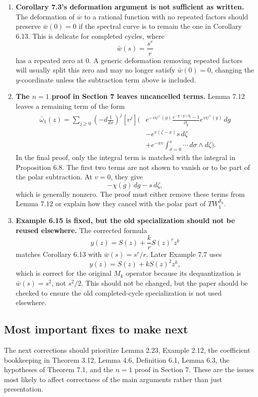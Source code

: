 \documentclass[11pt]{article}
\begin{document}
\begin{enumerate}[label=\textbf{\arabic*.}]
   \item \textbf{Corollary 7.3's deformation argument is not sufficient as written.}
   The deformation of $\bar w$ to a rational function with no repeated factors should preserve $\bar w(0)=0$ if the spectral curve is to remain the one in Corollary 6.13.  This is delicate for completed cycles, where
   \[
      \bar w(s)=\frac{s^r}{r}
   \]
   has a repeated zero at $0$.  A generic deformation removing repeated factors will usually split this zero and may no longer satisfy $\bar w(0)=0$, changing the $y$-coordinate unless the subtraction term above is included.

   \item \textbf{The $n=1$ proof in Section 7 leaves uncancelled terms.}
   Lemma 7.12 leaves a remaining term of the form
   \[
   \begin{aligned}
      \bar\omega_1(z)
      =
      \sum_{j\ge0}
      \left(-d\frac1{dx}\right)^j[v^j]
      \Bigg(
      &
      e^{-v\psi^\vee(y)}
      \frac{e^{-\chi(g)\partial_y}-1}{\partial_y}
      e^{v\psi^\vee(y)}\,dg
      \\
      &-
      e^{v(\zeta-x)}s\,d\zeta
      \\
      &+
      e^{-xv}\int_{\sigma=0}^s
      \cdots\,d\sigma\wedge d\zeta
      \Bigg).
   \end{aligned}
   \]
   In the final proof, only the integral term is matched with the integral in Proposition 6.8.  The first two terms are not shown to vanish or to be part of the polar subtraction.  At $v=0$, they give
   \[
      -\chi(g)\,dg-s\,d\zeta,
   \]
   which is generally nonzero.  The proof must either remove these terms from Lemma 7.12 or explain how they cancel with the polar part of $T W^{\mathcal S_0}_1$.

   \item \textbf{Example 6.15 is fixed, but the old specialization should not be reused elsewhere.}
   The corrected formula
   \[
      y(z)=S(z)+\frac{k}{r}S(z)^rz^k
   \]
   matches Corollary 6.13 with $\bar w(s)=s^r/r$.  Later Example 7.7 uses
   \[
      y(z)=S(z)+kS(z)^2z^k,
   \]
   which is correct for the original $M_k$ operator because its dequantization is $\bar w(s)=s^2$, not $s^2/2$.  This should not be changed, but the paper should be checked to ensure the old completed-cycle specialization is not used elsewhere.
\end{enumerate}

\subsection*{Most important fixes to make next}

The next corrections should prioritize Lemma 2.23, Example 2.12, the coefficient bookkeeping in Theorem 3.12, Lemma 4.6, Definition 6.1, Lemma 6.3, the hypotheses of Theorem 7.1, and the $n=1$ proof in Section 7.  These are the issues most likely to affect correctness of the main arguments rather than just presentation.
\end{document}
